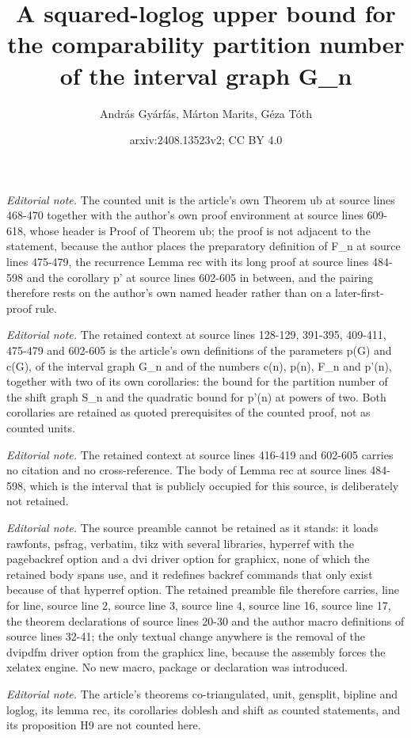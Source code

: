 \documentclass[12pt]{article}
\title{A squared-loglog upper bound for the comparability partition number of the interval graph G\_n}
\author{András Gyárfás, Márton Marits, Géza Tóth}
\date{arxiv:2408.13523v2; CC BY 4.0}
\begin{document}
\maketitle
\noindent\textit{Editorial note.} The counted unit is the article's own Theorem ub at source lines 468-470 together with the author's own proof environment at source lines 609-618, whose header is Proof of Theorem ub; the proof is not adjacent to the statement, because the author places the preparatory definition of F\_n at source lines 475-479, the recurrence Lemma rec with its long proof at source lines 484-598 and the corollary p' at source lines 602-605 in between, and the pairing therefore rests on the author's own named header rather than on a later-first-proof rule.\par\medskip
\noindent\textit{Editorial note.} The retained context at source lines 128-129, 391-395, 409-411, 475-479 and 602-605 is the article's own definitions of the parameters p(G) and c(G), of the interval graph G\_n and of the numbers c(n), p(n), F\_n and p'(n), together with two of its own corollaries: the bound for the partition number of the shift graph S\_n and the quadratic bound for p'(n) at powers of two. Both corollaries are retained as quoted prerequisites of the counted proof, not as counted units.\par\medskip
\noindent\textit{Editorial note.} The retained context at source lines 416-419 and 602-605 carries no citation and no cross-reference. The body of Lemma rec at source lines 484-598, which is the interval that is publicly occupied for this source, is deliberately not retained.\par\medskip
\noindent\textit{Editorial note.} The source preamble cannot be retained as it stands: it loads rawfonts, psfrag, verbatim, tikz with several libraries, hyperref with the pagebackref option and a dvi driver option for graphicx, none of which the retained body spans use, and it redefines backref commands that only exist because of that hyperref option. The retained preamble file therefore carries, line for line, source line 2, source line 3, source line 4, source line 16, source line 17, the theorem declarations of source lines 20-30 and the author macro definitions of source lines 32-41; the only textual change anywhere is the removal of the dvipdfm driver option from the graphicx line, because the assembly forces the xelatex engine. No new macro, package or declaration was introduced.\par\medskip
\noindent\textit{Editorial note.} The article's theorems co-triangulated, unit, gensplit, bipline and loglog, its lemma rec, its corollaries doblesh and shift as counted statements, and its proposition H9 are not counted here.\par\medskip
\end{document}
